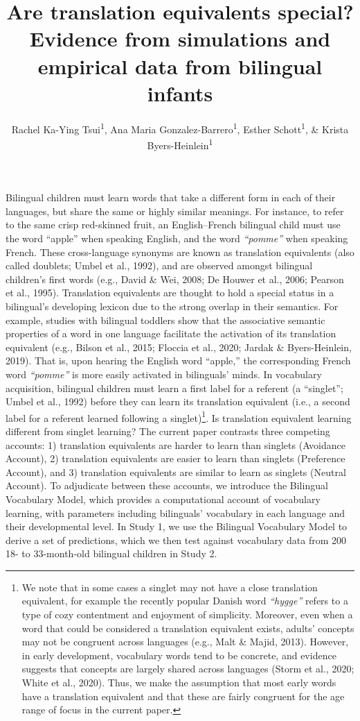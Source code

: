 \documentclass[
  english,
  ,man,floatsintext]{apa6}
\title{Are translation equivalents special? Evidence from simulations and empirical data from bilingual infants}
\author{Rachel Ka-Ying Tsui\textsuperscript{1}, Ana Maria Gonzalez-Barrero\textsuperscript{1}, Esther Schott\textsuperscript{1}, \& Krista Byers-Heinlein\textsuperscript{1}}
\date{}
\affiliation{\vspace{0.5cm}\textsuperscript{1} Concordia University}
\begin{document}
\maketitle

\captionsetup[table]{labelformat=empty}

Bilingual children must learn words that take a different form in each of their languages, but share the same or highly similar meanings. For instance, to refer to the same crisp red-skinned fruit, an English--French bilingual child must use the word ``apple'' when speaking English, and the word \emph{``pomme''} when speaking French. These cross-language synonyms are known as translation equivalents (also called doublets; Umbel et al., 1992), and are observed amongst bilingual children's first words (e.g., David \& Wei, 2008; De Houwer et al., 2006; Pearson et al., 1995). Translation equivalents are thought to hold a special status in a bilingual's developing lexicon due to the strong overlap in their semantics. For example, studies with bilingual toddlers show that the associative semantic properties of a word in one language facilitate the activation of its translation equivalent (e.g., Bilson et al., 2015; Floccia et al., 2020; Jardak \& Byers-Heinlein, 2019). That is, upon hearing the English word ``apple,'' the corresponding French word \emph{``pomme''} is more easily activated in bilinguals' minds. In vocabulary acquisition, bilingual children must learn a first label for a referent (a ``singlet''; Umbel et al., 1992) before they can learn its translation equivalent (i.e., a second label for a referent learned following a singlet)\footnote{We note that in some cases a singlet may not have a close translation equivalent, for example the recently popular Danish word \emph{``hygge''} refers to a type of cozy contentment and enjoyment of simplicity. Moreover, even when a word that could be considered a translation equivalent exists, adults' concepts may not be congruent across languages (e.g., Malt \& Majid, 2013). However, in early development, vocabulary words tend to be concrete, and evidence suggests that concepts are largely shared across languages (Storm et al., 2020; White et al., 2020). Thus, we make the assumption that most early words have a translation equivalent and that these are fairly congruent for the age range of focus in the current paper.}. Is translation equivalent learning different from singlet learning? The current paper contrasts three competing accounts: 1) translation equivalents are harder to learn than singlets (Avoidance Account), 2) translation equivalents are easier to learn than singlets (Preference Account), and 3) translation equivalents are similar to learn as singlets (Neutral Account). To adjudicate between these accounts, we introduce the Bilingual Vocabulary Model, which provides a computational account of vocabulary learning, with parameters including bilinguals' vocabulary in each language and their developmental level. In Study 1, we use the Bilingual Vocabulary Model to derive a set of predictions, which we then test against vocabulary data from 200 18- to 33-month-old bilingual children in Study 2.
\end{document}
